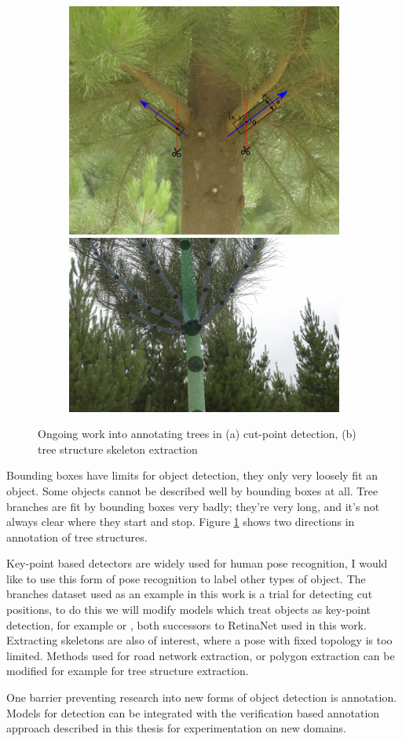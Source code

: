 \begin{figure}[h!]
\centering
\begin{subfigure}[t]{1.0\linewidth}
  \includegraphics[width=0.475\linewidth]{figures/future/tree_cutpoint.pdf}
  \hfill
  \includegraphics[width=0.475\linewidth]{figures/future/tree_branches.jpg}
  \caption{}
\end{subfigure}
\caption{Ongoing work into annotating trees in (a) cut-point detection, (b) tree structure skeleton extraction }
\label {fig:future_trees}
\end{figure}

Bounding boxes have limits for object detection, they only very loosely fit an object. Some objects cannot be described well by bounding boxes at all. Tree branches are fit by bounding boxes very badly; they're very long, and it's not always clear where they start and stop. Figure \ref{fig:future_trees} shows two directions in annotation of tree structures. 

Key-point based detectors are widely used for human pose recognition, I would like to use this form of pose recognition to label other types of object. The branches dataset used as an example in this work is a trial for detecting cut positions, to do this we will modify models which treat objects as key-point detection, for example \cite{Zhou2019} or \cite{Law2018}, both successors to RetinaNet \cite{Wang2017} used in this work. Extracting skeletons are also of interest, where a pose with fixed topology is too limited. Methods used for road network extraction, or polygon extraction can be modified for example for tree structure extraction. 

One barrier preventing research into new forms of object detection is annotation. Models for detection can be integrated with the verification based annotation approach described in this thesis for experimentation on new domains.

